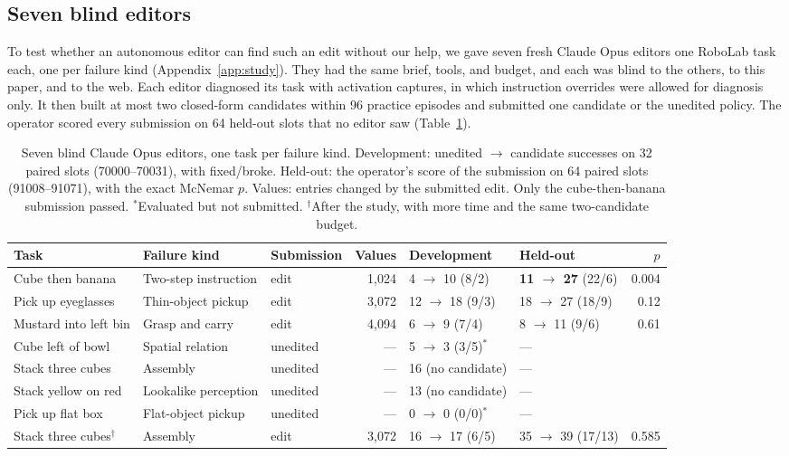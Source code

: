 \documentclass{article}
\begin{document}
\subsection{Seven blind editors}
\label{sec:blind}
To test whether an autonomous editor can find such an edit without our help, we gave seven fresh Claude Opus editors one RoboLab task each, one per failure kind (Appendix~\ref{app:study}). They had the same brief, tools, and budget, and each was blind to the others, to this paper, and to the web. Each editor diagnosed its task with activation captures, in which instruction overrides were allowed for diagnosis only. It then built at most two closed-form candidates within 96 practice episodes and submitted one candidate or the unedited policy. The operator scored every submission on 64 held-out slots that no editor saw (Table~\ref{tab:study}).

\begin{table}[!t]
\centering\small
\caption{Seven blind Claude Opus editors, one task per failure kind. Development: unedited $\to$ candidate successes on 32 paired slots (70000--70031), with fixed/broke. Held-out: the operator's score of the submission on 64 paired slots (91008--91071), with the exact McNemar $p$. Values: entries changed by the submitted edit. Only the cube-then-banana submission passed. $^*$Evaluated but not submitted. $^\dagger$After the study, with more time and the same two-candidate budget.}
\label{tab:study}
\setlength{\tabcolsep}{2.8pt}
\begin{tabular}{@{}lllrllr@{}}
\toprule
Task & Failure kind & Submission & Values & Development & Held-out & $p$\\
\midrule
Cube then banana & Two-step instruction & edit & 1,024 & 4 $\to$ 10 (8/2) & \textbf{11 $\to$ 27} (22/6) & 0.004\\
Pick up eyeglasses & Thin-object pickup & edit & 3,072 & 12 $\to$ 18 (9/3) & 18 $\to$ 27 (18/9) & 0.12\\
Mustard into left bin & Grasp and carry & edit & 4,094 & 6 $\to$ 9 (7/4) & 8 $\to$ 11 (9/6) & 0.61\\
Cube left of bowl & Spatial relation & unedited & --- & 5 $\to$ 3 (3/5)$^*$ & --- & \\
Stack three cubes & Assembly & unedited & --- & 16 (no candidate) & --- & \\
Stack yellow on red & Lookalike perception & unedited & --- & 13 (no candidate) & --- & \\
Pick up flat box & Flat-object pickup & unedited & --- & 0 $\to$ 0 (0/0)$^*$ & --- & \\
\midrule
Stack three cubes$^\dagger$ & Assembly & edit & 3,072 & 16 $\to$ 17 (6/5) & 35 $\to$ 39 (17/13) & 0.585\\
\bottomrule
\end{tabular}
\end{table}
\end{document}
